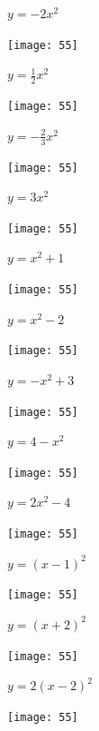 \documentclass[a4paper]{oblivoir}
\begin{document}
\clearpage
\begin{minipage}{0.45\textwidth}\centering
\(y=-2x^2\)
\par\bigskip\texttt{[image: 55]}
\end{minipage}
\begin{minipage}{0.45\textwidth}\centering
\(y=\frac12x^2\)
\par\bigskip\texttt{[image: 55]}
\end{minipage}\bigskip\bigskip\par
\begin{minipage}{0.45\textwidth}\centering
\(y=-\frac23x^2\)
\par\bigskip\texttt{[image: 55]}
\end{minipage}
\begin{minipage}{0.45\textwidth}\centering
\(y=3x^2\)
\par\bigskip\texttt{[image: 55]}
\end{minipage}\bigskip\bigskip\par
\begin{minipage}{0.45\textwidth}\centering
\(y=x^2+1\)
\par\bigskip\texttt{[image: 55]}
\end{minipage}
\begin{minipage}{0.45\textwidth}\centering
\(y=x^2-2\)
\par\bigskip\texttt{[image: 55]}
\end{minipage}\bigskip\bigskip\par


\clearpage
\begin{minipage}{0.45\textwidth}\centering
\(y=-x^2+3\)
\par\bigskip\texttt{[image: 55]}
\end{minipage}
\begin{minipage}{0.45\textwidth}\centering
\(y=4-x^2\)
\par\bigskip\texttt{[image: 55]}
\end{minipage}\bigskip\bigskip\par
\begin{minipage}{0.45\textwidth}\centering
\(y=2x^2-4\)
\par\bigskip\texttt{[image: 55]}
\end{minipage}
\begin{minipage}{0.45\textwidth}\centering
\(y=(x-1)^2\)
\par\bigskip\texttt{[image: 55]}
\end{minipage}\bigskip\bigskip\par
\begin{minipage}{0.45\textwidth}\centering
\(y=(x+2)^2\)
\par\bigskip\texttt{[image: 55]}
\end{minipage}
\begin{minipage}{0.45\textwidth}\centering
\(y=2(x-2)^2\)
\par\bigskip\texttt{[image: 55]}
\end{minipage}\bigskip\bigskip\par
\end{document}
